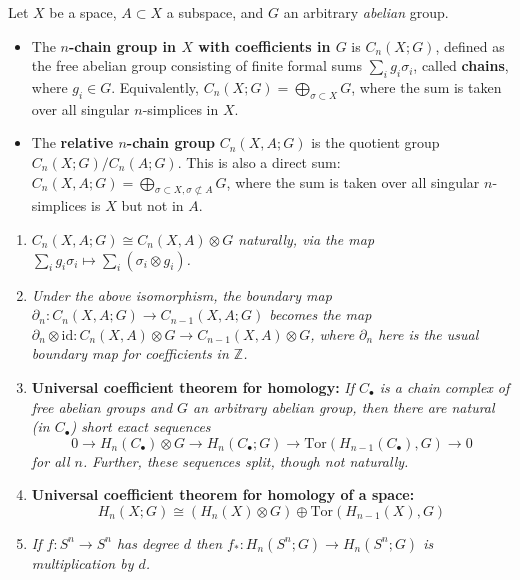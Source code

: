 \documentclass[10pt]{article}
\newcommand{\zz}{\mathbb{Z}}
\newcommand{\id}{\mathrm{id}}
\newcommand{\Tor}{\mathrm{Tor}}
\begin{document}
            Let $X$ be a space, $A\subset X$ a subspace, and $G$ an arbitrary \emph{abelian} group.

            \begin{itemize}
                \item The \textbf{$n$-chain group in $X$ with coefficients in $G$} is $C_n(X;G)$, defined as the free abelian group consisting of finite formal sums $\sum_i g_i\sigma_i$, called \textbf{chains}, where $g_i\in G$.
                    Equivalently, $C_n(X;G)=\bigoplus_{\sigma\subset X}G$, where the sum is taken over all singular $n$-simplices in $X$.
                \item The \textbf{relative $n$-chain group} $C_n(X,A;G)$ is the quotient group $C_n(X;G)/C_n(A;G)$.
                    This is also a direct sum: $C_n(X,A;G)=\bigoplus_{\sigma\subset X,\sigma\not\subset A}G$, where the sum is taken over all singular $n$-simplices is $X$ but not in $A$.
            \end{itemize}

            \begin{enumerate}
                \item \emph{$C_n(X,A;G)\cong C_n(X,A)\otimes G$ naturally, via the map $\sum_i g_i\sigma_i\mapsto\sum_i(\sigma_i\otimes g_i)$.}
                \item \emph{Under the above isomorphism, the boundary map $\partial_n\colon C_n(X,A;G)\to C_{n-1}(X,A;G)$ becomes the map $\partial_n\otimes\id\colon C_n(X,A)\otimes G\to C_{n-1}(X,A)\otimes G$, where $\partial_n$ here is the usual boundary map for coefficients in $\zz$.}
                \item \textbf{Universal coefficient theorem for homology:} \emph{If $C_\bullet$ is a chain complex of free abelian groups and $G$ an arbitrary abelian group, then there are natural (in $C_\bullet$) short exact sequences}
                    \begin{equation*}
                        0\to H_n(C_\bullet)\otimes G\to H_n(C_\bullet;G)\to\Tor(H_{n-1}(C_\bullet),G)\to0
                    \end{equation*}
                    \emph{for all $n$.}
                    \emph{Further, these sequences split, though \emph{not} naturally.}
                \item \textbf{Universal coefficient theorem for homology of a space:} $$H_n(X;G)\cong (H_n(X)\otimes G)\oplus\Tor(H_{n-1}(X),G)$$
                \item \emph{If $f\colon S^n\to S^n$ has degree $d$ then $f_*\colon H_n(S^n;G)\to H_n(S^n;G)$ is multiplication by $d$.}
            \end{enumerate}
\end{document}
